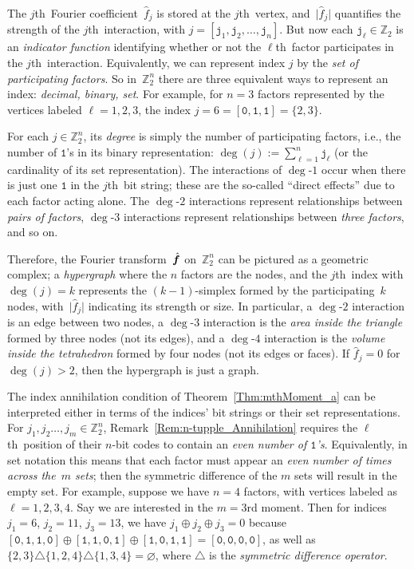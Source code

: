 \documentclass[letterpaper,11pt]{article}
\newcommand{\bs}[1]{{\boldsymbol{#1}}}
\newcommand{\gr}[1]{( #1 )}
\newcommand{\abs}[1]{\vert #1 \vert}
\newcommand{\set}[1]{\{ #1 \}}
\newcommand{\vect}[1]{[ #1 ]}
\newcommand{\Int}{\mathbb Z}
\newcommand{\bcode}[1]{\texttt{#1}}
\newcommand{\hatbsf}{{\kern+0.25em}\hat{{\kern-0.25em}\bs{f}}}
\newcommand{\jth}{$j$th}
\newcommand{\ellth}{$\ell$th}
\theoremstyle{definition} \newtheorem{remark}{Remark}
\begin{document}
The \jth\ Fourier coefficient~$\hat{f}_j$ is stored at the \jth\ vertex, and~$\abs{\hat{f}_j}$ quantifies the strength of the \jth\ interaction, with $j = \vect{\bcode{j}_1, \bcode{j}_2, \ldots, \bcode{j}_n}$. But now each $\bcode{j}_\ell\in\Int_2$ is an \emph{indicator function} identifying whether or not the \ellth\ factor participates in the \jth\ interaction. Equivalently, we can represent index $j$ by the \emph{set of participating factors}. So in~$\Int_2^n$ there are three equivalent ways to represent an index: \emph{decimal, binary, set}. For example, for $n=3$ factors represented by the vertices labeled $\ell = 1,2,3$, the index $j = 6 = \vect{\bcode{0},\bcode{1},\bcode{1}} = \set{2,3}$.

For each $j\in\Int_2^n$, its \emph{degree} is simply the number of participating factors, i.e., the number of $\bcode{1}$'s in its binary representation: $\deg\gr{j}:=\sum_{\ell=1}^n \bcode{j}_\ell$ (or the cardinality of its set representation). The interactions of $\deg$-$1$ occur when there is just one $\bcode{1}$ in the \jth\ bit string; these are the so-called ``direct effects'' due to each factor acting alone. The $\deg$-$2$ interactions represent relationships between \emph{pairs of factors}, $\deg$-$3$ interactions represent relationships between \emph{three factors}, and so on.

Therefore, the Fourier transform~$\hatbsf$ on~$\Int_2^n$ can be pictured as a geometric complex; a \emph{hypergraph} where the $n$ factors are the nodes, and the \jth\ index with $\deg\gr{j}=k$ represents the $\gr{k-1}$-simplex formed by the participating~$k$ nodes, with~$\abs{\hat{f}_j}$ indicating its strength or size. In particular, a $\deg$-$2$ interaction is an edge between two nodes, a $\deg$-$3$ interaction is the \emph{area inside the triangle} formed by three nodes (not its edges), and a $\deg$-$4$ interaction is the \emph{volume inside the tetrahedron} formed by four nodes (not its edges or faces). If $\hat{f}_j = 0$ for $\deg\gr{j}>2$, then the hypergraph is just a graph.

The index annihilation condition of Theorem~\ref{Thm:mthMoment_a} can be interpreted either in terms of the indices' bit strings or their set representations. For $j_1,j_2\ldots,j_m \in \Int_2^n$, Remark~\ref{Rem:n-tupple_Annihilation} requires the \ellth\ position of their $n$-bit codes to contain an \emph{even number of $\bcode{1}$'s}. Equivalently, in set notation this means that each factor must appear an \emph{even number of times across the~$m$ sets}; then the symmetric difference of the $m$ sets will result in the empty set. For example, suppose we have $n=4$ factors, with vertices labeled as $\ell = 1,2,3,4$. Say we are interested in the $m=3$rd moment. Then for indices $j_1=6$, $j_2=11$, $j_3=13$, we have $j_1 \oplus j_2 \oplus j_3 = 0$ because
$\vect{\bcode{0},\bcode{1},\bcode{1},\bcode{0}} \oplus \vect{\bcode{1},\bcode{1},\bcode{0},\bcode{1}} \oplus \vect{\bcode{1},\bcode{0},\bcode{1},\bcode{1}} = \vect{\bcode{0},\bcode{0},\bcode{0},\bcode{0}}$, as well as
$\set{2,3} \triangle \set{1,2,4} \triangle \set{1,3,4} = \varnothing$,
where $\triangle$ is the \emph{symmetric difference operator}.
\end{document}
